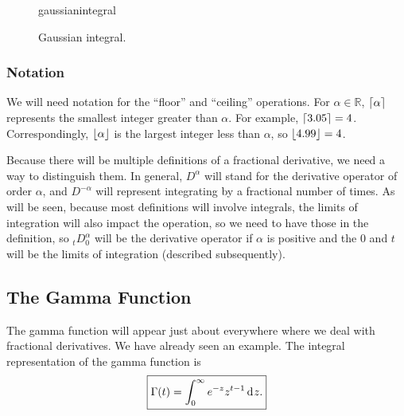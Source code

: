 \begin{figure}
  \centering
  {gaussianintegral}
  \caption{Gaussian integral.}
  \label{fig:gaussianintegral}
\end{figure}


\subsubsection{Notation}
We will need notation for the ``floor'' and ``ceiling'' operations. For $\alpha \in \mathbb R$, $\left\lceil \alpha \right\rceil$ represents the smallest integer greater than $\alpha$. For example, $\left\lceil 3.05 \right\rceil = 4$. Correspondingly, $\left\lfloor \alpha \right\rfloor$ is the largest integer less than $\alpha$, so $\left\lfloor 4.99 \right\rfloor = 4$. 

Because there will be multiple definitions of a fractional derivative, we need a way to distinguish them. In general, $D^\alpha$ will stand for the derivative operator of order $\alpha$, and $D^{-\alpha}$ will represent integrating by a fractional number of times. As will be seen, because most definitions will involve integrals, the limits of integration will also impact the operation, so we need to have those in the definition, so $_tD^\alpha_0$ will be the derivative operator if $\alpha$ is positive and the $0$ and $t$ will be the limits of integration (described subsequently). 

\subsection{The Gamma Function}
The gamma function will appear just about everywhere where we deal with fractional derivatives. We have already seen an example. The integral representation of the gamma function is
\begin{equation}
  \boxed{ \Gamma(t) = \int_0^\infty e^{-z} z^{t-1} \operatorname{d}\hspace*{-1pt} z. }
  \label{eq:gammadef}
\end{equation}

